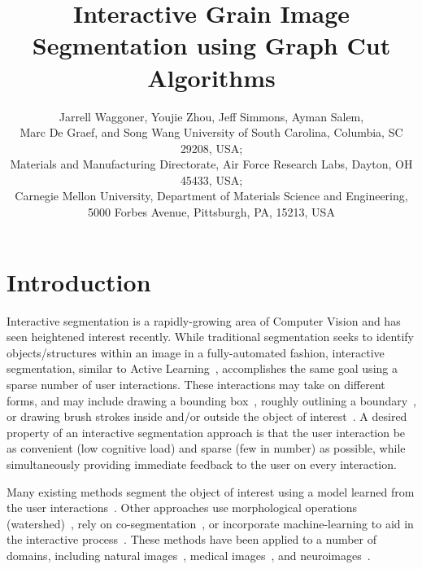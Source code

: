 \documentclass[]{spie}  %
\title{Interactive Grain Image Segmentation using Graph Cut Algorithms}
\author{Jarrell Waggoner\supit{a}, Youjie Zhou\supit{a}, Jeff Simmons\supit{b}, Ayman Salem\supit{b}, \\ Marc De Graef\supit{c}, and Song Wang\supit{a}
\skiplinehalf
\supit{a}University of South Carolina, Columbia, SC 29208, USA; \\
\supit{b}Materials and Manufacturing Directorate, Air Force Research
Labs, Dayton, OH 45433, USA; \\
\supit{c} Carnegie Mellon University, Department of Materials Science and Engineering, 5000 Forbes Avenue, Pittsburgh, PA, 15213, USA
}
\begin{document}
 
  \maketitle 

\begin{abstract}
% 

\end{abstract}




\section{Introduction}
\label{sec:intro}

Interactive segmentation is a rapidly-growing area of Computer Vision
and has seen heightened interest recently\cite{kuang:12,straehle:12}.
While traditional segmentation seeks to identify objects/structures
within an image in a fully-automated fashion, interactive
segmentation, similar to Active Learning~\cite{settles:09},
accomplishes the same goal using a sparse number of user interactions.
These interactions may take on different forms, and may include
drawing a bounding box~\cite{rother:04}, roughly outlining a
boundary~\cite{mortensen:95}, or drawing brush strokes inside and/or
outside the object of interest~\cite{santner:10, unger:08, boykov:01b,
  vezhnevets:95}.  A desired property of an interactive segmentation
approach is that the user interaction be as convenient (\ie low
cognitive load) and sparse (\ie few in number) as possible, while
simultaneously providing immediate feedback to the user on every
interaction.

Many existing methods segment the object of interest using a model
learned from the user interactions~\cite{boykov:01b, unger:08,
  rother:04}.  Other approaches use morphological operations
(watershed)~\cite{straehle:12}, rely on
co-segmentation~\cite{batra:10}, or incorporate machine-learning to
aid in the interactive process~\cite{top:11, kuant:12}.  These methods
have been applied to a number of domains, including natural
images~\cite{rother:04}, medical images~\cite{boykov:00}, and
neuroimages~\cite{straehle:11, straehle:12}.
\end{document}
